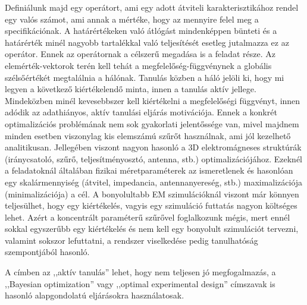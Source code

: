 \documentclass[12pt,a4paper,oneside]{report}
\begin{document}
Definiálunk majd egy operátort, ami egy adott átviteli karakterisztikához rendel egy valós számot, ami annak a mértéke, hogy az mennyire felel meg a specifikációnak. A határértékeken való átlógást mindenképpen bünteti és a határérték minél nagyobb tartalékkal való teljesítését esetleg jutalmazza ez az operátor. Ennek az operátornak a célszerű megadása is a feladat része. Az elemérték-vektorok terén kell tehát a megfelelőség-függvénynek a globális szélsőértékét megtalálnia a hálónak. Tanulás közben a háló jelöli ki, hogy mi legyen a következő kiértékelendő minta, innen a tanulás aktív jellege. Mindeközben minél kevesebbszer kell kiértékelni a megfelelőségi függvényt, innen adódik az adathiányos, aktív tanulási eljárás motivációja. Ennek a konkrét optimalizációs problémának nem sok gyakorlati jelentőssége van, mivel majdnem minden esetben viszonylag kis elemszámú szűrőt használnak, ami jól kezelhető analitikusan. Jellegében viszont nagyon hasonló a 3D elektromágneses struktúrák (iránycsatoló, szűrő, teljesítményosztó, antenna, stb.) optimalizációjához. Ezeknél a feladatoknál általában fizikai méretparaméterek az ismeretlenek és hasonlóan egy skalármennyiség (átvitel, impedancia, antennanyereség, stb.) maximalizációja (minimalizációja) a cél. A bonyolultabb EM szimulációknál viszont már könnyen teljesülhet, hogy egy kiértékelés, vagyis egy szimuláció futtatás nagyon költséges lehet. Azért a koncentrált paraméterű szűrővel foglalkozunk mégis, mert ennél sokkal egyszerűbb egy kiértékelés és nem kell egy bonyolult szimulációt tervezni, valamint sokszor lefuttatni, a rendszer viselkedése pedig tanulhatóság szempontjából hasonló.

A címben az ,,aktív tanulás'' lehet, hogy nem teljesen jó megfogalmazás, a ,,Bayesian optimization'' vagy ,,optimal experimental design'' címszavak is hasonló alapgondolatú eljárásokra használatosak.
\end{document}
